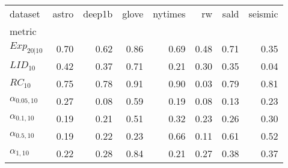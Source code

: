 \begin{tabular}{lrrrrrrr}
dataset & astro & deep1b & glove & nytimes & rw & sald & seismic \\
metric &  &  &  &  &  &  &  \\
$Exp_{20|10}$ & 0.70 & 0.62 & 0.86 & 0.69 & 0.48 & 0.71 & 0.35 \\
$LID_{10}$ & 0.42 & 0.37 & 0.71 & 0.21 & 0.30 & 0.35 & 0.04 \\
$RC_{10}$ & 0.75 & 0.78 & 0.91 & 0.90 & 0.03 & 0.79 & 0.81 \\
$\alpha_{0.05, 10}$ & 0.27 & 0.08 & 0.59 & 0.19 & 0.08 & 0.13 & 0.23 \\
$\alpha_{0.1, 10}$ & 0.19 & 0.21 & 0.51 & 0.32 & 0.23 & 0.26 & 0.30 \\
$\alpha_{0.5, 10}$ & 0.19 & 0.22 & 0.23 & 0.66 & 0.11 & 0.61 & 0.52 \\
$\alpha_{1, 10}$ & 0.22 & 0.28 & 0.84 & 0.21 & 0.27 & 0.38 & 0.37 \\
\end{tabular}

